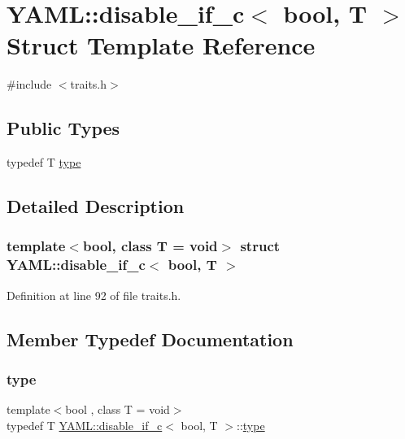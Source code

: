 \hypertarget{struct_y_a_m_l_1_1disable__if__c}{}\section{Y\+A\+ML\+::disable\+\_\+if\+\_\+c$<$ bool, T $>$ Struct Template Reference}
\label{struct_y_a_m_l_1_1disable__if__c}


{\ttfamily \#include $<$traits.\+h$>$}

\subsection*{Public Types}
\begin{DoxyCompactItemize}
\item 
typedef T \mbox{\hyperlink{struct_y_a_m_l_1_1disable__if__c_aa334aadd4ea051c60bcd2abf51bc8a52}{type}}
\end{DoxyCompactItemize}


\subsection{Detailed Description}
\subsubsection*{template$<$bool, class T = void$>$\newline
struct Y\+A\+M\+L\+::disable\+\_\+if\+\_\+c$<$ bool, T $>$}



Definition at line 92 of file traits.\+h.



\subsection{Member Typedef Documentation}
\mbox{\label{struct_y_a_m_l_1_1disable__if__c_aa334aadd4ea051c60bcd2abf51bc8a52}} 
\subsubsection{\texorpdfstring{type}{type}}
{\footnotesize\ttfamily template$<$bool , class T = void$>$ \\
typedef T \mbox{\hyperlink{struct_y_a_m_l_1_1disable__if__c}{Y\+A\+M\+L\+::disable\+\_\+if\+\_\+c}}$<$ bool, T $>$\+::\mbox{\hyperlink{struct_y_a_m_l_1_1disable__if__c_aa334aadd4ea051c60bcd2abf51bc8a52}{type}}}



